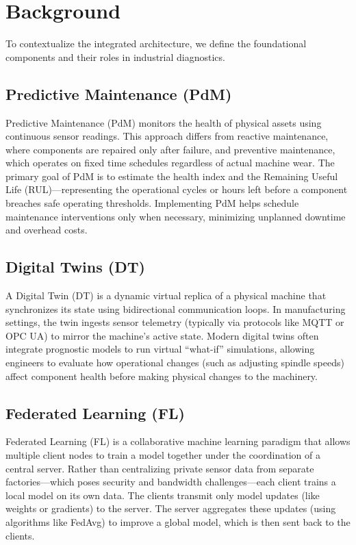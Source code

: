 \documentclass[journal,10pt,compsoc]{IEEEtran}
\begin{document}
\section{Background}
\label{sec:background}

To contextualize the integrated architecture, we define the foundational components and their roles in industrial diagnostics.

\subsection{Predictive Maintenance (PdM)}
Predictive Maintenance (PdM) monitors the health of physical assets using continuous sensor readings. This approach differs from reactive maintenance, where components are repaired only after failure, and preventive maintenance, which operates on fixed time schedules regardless of actual machine wear. The primary goal of PdM is to estimate the health index and the Remaining Useful Life (RUL)---representing the operational cycles or hours left before a component breaches safe operating thresholds. Implementing PdM helps schedule maintenance interventions only when necessary, minimizing unplanned downtime and overhead costs.

\subsection{Digital Twins (DT)}
A Digital Twin (DT) is a dynamic virtual replica of a physical machine that synchronizes its state using bidirectional communication loops. In manufacturing settings, the twin ingests sensor telemetry (typically via protocols like MQTT or OPC UA) to mirror the machine's active state. Modern digital twins often integrate prognostic models to run virtual ``what-if'' simulations, allowing engineers to evaluate how operational changes (such as adjusting spindle speeds) affect component health before making physical changes to the machinery.

\subsection{Federated Learning (FL)}
Federated Learning (FL) is a collaborative machine learning paradigm that allows multiple client nodes to train a model together under the coordination of a central server. Rather than centralizing private sensor data from separate factories---which poses security and bandwidth challenges---each client trains a local model on its own data. The clients transmit only model updates (like weights or gradients) to the server. The server aggregates these updates (using algorithms like FedAvg) to improve a global model, which is then sent back to the clients.
\end{document}
